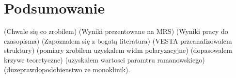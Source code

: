 \newpage

\section{Podsumowanie}

(Chwale się co zrobilem) (Wyniki prezentowane na MRS) (Wyniki pracy do czasopisma) (Zapoznalem się z bogatą literatura) (VESTA przeanalizowalem struktury) (pomiary zrobilem uzyskalem widm polaryzacyjne) (dopasowalem krzywe teoretyczne) (uzyskalem wartosci paramtru ramanowskiego) (duzeprawdopodobienstwo ze monoklinik).